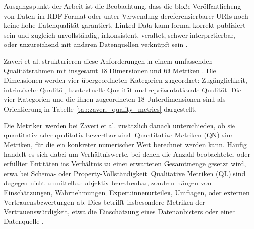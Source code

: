 Ausgangspunkt der Arbeit ist die Beobachtung, dass die bloße Veröffentlichung von Daten im RDF-Format oder unter Verwendung dereferenzierbarer URIs noch keine hohe Datenqualität garantiert. Linked Data kann formal korrekt publiziert sein und zugleich unvollständig, inkonsistent, veraltet, schwer interpretierbar, oder unzureichend mit anderen Datenquellen verknüpft sein \cite{Zaveri2016LinkedDataQuality}. 

Zaveri et al. strukturieren diese Anforderungen in einem umfassenden Qualitätsrahmen mit insgesamt 18 Dimensionen und 69 Metriken \cite{Zaveri2016LinkedDataQuality}. Die Dimensionen werden vier übergeordneten Kategorien zugeordnet: Zugänglichkeit, intrinsische Qualität, kontextuelle Qualität und repräsentationale Qualität. 
Die vier Kategorien und die ihnen zugeordneten 18 Unterdimensionen sind als Orientierung in Tabelle \ref{tab:zaveri_quality_metrics} dargestellt.

Die Metriken werden bei Zaveri et al. zusätzlich danach unterschieden, ob sie quantitativ oder qualitativ bewertbar sind. Quantitative Metriken (QN) sind Metriken, für die ein konkreter numerischer Wert berechnet werden kann. Häufig handelt es sich dabei um Verhältniswerte, bei denen die Anzahl beobachteter oder erfüllter Entitäten ins Verhältnis zu einer erwarteten Gesamtmenge gesetzt wird, etwa bei Schema- oder Property-Vollständigkeit. Qualitative Metriken (QL) sind dagegen nicht unmittelbar objektiv berechenbar, sondern hängen von Einschätzungen, Wahrnehmungen, Expert:innenurteilen, Umfragen, oder externen Vertrauensbewertungen ab. Dies betrifft insbesondere Metriken der Vertrauenswürdigkeit, etwa die Einschätzung eines Datenanbieters oder einer Datenquelle \cite{Zaveri2016LinkedDataQuality}.



\captionsetup[table]{justification=centering}

